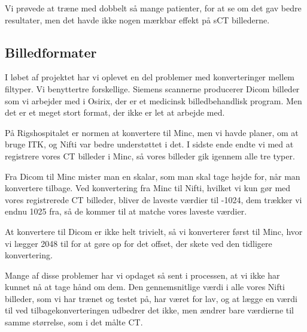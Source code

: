 Vi prøvede at træne med dobbelt så mange patienter, for at se om det gav bedre resultater, men det havde ikke nogen mærkbar effekt på sCT billederne.


\subsection{Billedformater}

I løbet af projektet har vi oplevet en del problemer med konverteringer
mellem filtyper. Vi benyttertre forskellige. Siemens scannerne producerer
Dicom billeder som vi arbejder med i Osirix, der er et medicinsk
billedbehandlisk program. Men det er et meget stort format, der ikke er
let at arbejde med. 

På Rigshospitalet er normen at konvertere til Minc, men vi havde planer,
om at bruge ITK, og Nifti var bedre understøttet i det. I sidste ende
endte vi med at registrere vores CT billeder i Minc, så vores billeder gik
igennem alle tre typer. 

Fra Dicom til Minc mister man en skalar, som man skal tage højde for, når
man konvertere tilbage. Ved konvertering fra Minc til Nifti, hvilket vi
kun gør med vores registrerede CT billeder, bliver de laveste værdier til
-1024, dem trækker vi endnu 1025 fra, så de kommer til at matche vores
laveste værdier.


At konvertere til Dicom er ikke helt trivielt, så vi konverterer først til
Minc, hvor vi lægger 2048 til for at gøre op for det offset, der skete ved
den tidligere konvertering. 

Mange af disse problemer har vi opdaget så sent i processen, at vi ikke
har kunnet nå at tage hånd om dem. Den gennemsnitlige værdi i alle vores
Nifti billeder, som vi har trænet og testet på, har været for lav, og at
lægge en værdi til ved tilbagekonverteringen udbedrer det ikke, men ændrer
bare værdierne til samme størrelse, som i det målte CT.



